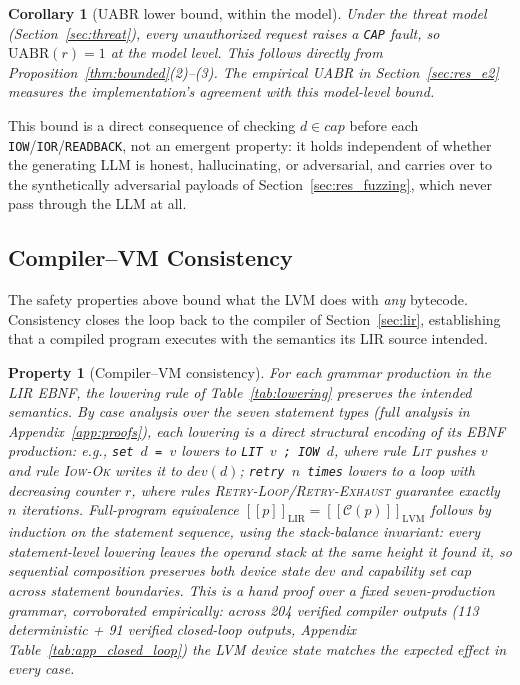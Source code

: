 \documentclass[a4paper,fleqn,longmktitle]{cas-dc}
\newcommand{\llbracket}{[\![}
\newcommand{\rrbracket}{]\!]}
\newtheorem{property}{Property}
\newtheorem{corollary}{Corollary}
\begin{document}
\begin{corollary}[UABR lower bound, within the model]
\label{prop:uabr}
Under the threat model (Section~\ref{sec:threat}), every unauthorized request raises a \texttt{CAP} fault, so $\text{UABR}(r) = 1$ at the model level. This follows directly from Proposition~\ref{thm:bounded}(2)--(3). The empirical UABR in Section~\ref{sec:res_e2} measures the implementation's agreement with this model-level bound.
\end{corollary}

\noindent This bound is a direct consequence of checking $d \in \mathit{cap}$ before each \texttt{IOW}/\texttt{IOR}/\texttt{READBACK}, not an emergent property: it holds independent of whether the generating LLM is honest, hallucinating, or adversarial, and carries over to the synthetically adversarial payloads of Section~\ref{sec:res_fuzzing}, which never pass through the LLM at all.

\subsection{Compiler--VM Consistency}
\label{sec:consistency}

The safety properties above bound what the LVM does with \emph{any} bytecode. Consistency closes the loop back to the compiler of Section~\ref{sec:lir}, establishing that a compiled program executes with the semantics its LIR source intended.

\begin{property}[Compiler--VM consistency]
\label{prop:consistency}
For each grammar production in the LIR EBNF, the lowering rule of Table~\ref{tab:lowering} preserves the intended semantics. By case analysis over the seven statement types (full analysis in Appendix~\ref{app:proofs}), each lowering is a direct structural encoding of its EBNF production: e.g., \texttt{set $d$ = $v$} lowers to \texttt{LIT $v$ ; IOW $d$}, where rule \textsc{Lit} pushes $v$ and rule \textsc{Iow-Ok} writes it to $\mathit{dev}(d)$; \texttt{retry $n$ times} lowers to a loop with decreasing counter $r$, where rules \textsc{Retry-Loop}/\textsc{Retry-Exhaust} guarantee exactly $n$ iterations. Full-program equivalence $\llbracket p \rrbracket_{\text{LIR}} = \llbracket \mathcal{C}(p) \rrbracket_{\text{LVM}}$ follows by induction on the statement sequence, using the \emph{stack-balance invariant}: every statement-level lowering leaves the operand stack at the same height it found it, so sequential composition preserves both device state $\mathit{dev}$ and capability set $\mathit{cap}$ across statement boundaries. This is a hand proof over a fixed seven-production grammar, corroborated empirically: across 204 verified compiler outputs (113 deterministic + 91 verified closed-loop outputs, Appendix Table~\ref{tab:app_closed_loop}) the LVM device state matches the expected effect in every case.
\end{property}
\end{document}
